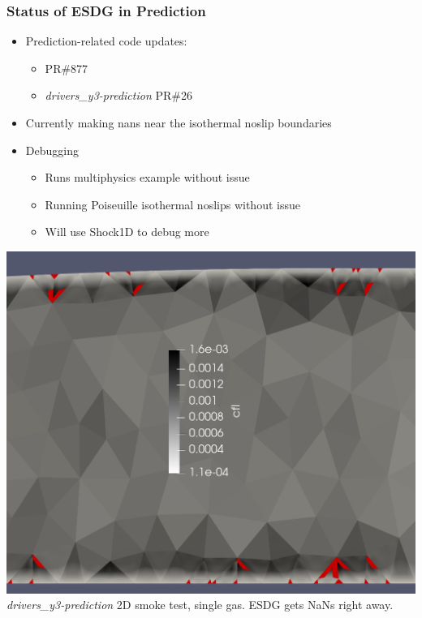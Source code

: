 \begin{frame}
  \frametitle{Status of ESDG in Prediction}
  \begin{minipage}[b]{0.48\textwidth}
      \begin{itemize}
      \item Prediction-related code updates:
        \begin{itemize}
        \item \mirgecom{} PR\#877
        \item \textit{drivers\_y3-prediction} PR\#26
        \end{itemize}
      \item Currently making nans near the isothermal noslip boundaries
      \item Debugging
        \begin{itemize}
        \item Runs multiphysics example without issue
        \item Running Poiseuille isothermal noslips without issue 
        \item Will use Shock1D to debug more
        \end{itemize}
      \end{itemize}
  \end{minipage}\hfill
  \begin{minipage}[b]{0.48\textwidth}
    \centering
    \includegraphics[width=.9\textwidth]{figures/prediction-esdg-nans.png}
    \vspace{5pt} %
    \footnotesize \textit{drivers\_y3-prediction} 2D smoke test, single gas. ESDG gets NaNs right away.
  \end{minipage}
\end{frame}

